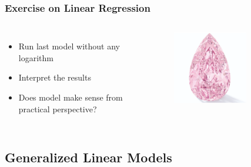 \documentclass[
    utf8,
    aspectratio=169
]{beamer}  %
\begin{document}
\begin{frame}
	\frametitle{Exercise on Linear Regression}
	\begin{columns}
		\begin{itemize}
			\item Run last model without any logarithm
			\item Interpret the results
			\item Does model make sense from practical perspective?
		\end{itemize}
		\begin{figure}
			\includegraphics[width=0.7\textwidth]{pics/dia2.png}
		\end{figure}
	\end{columns}
\end{frame}

\subsection{Generalized Linear Models}
\end{document}
